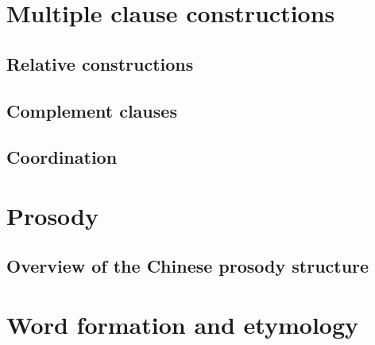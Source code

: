 \documentclass[UTF8, a4paper, oneside, scheme=plain]{ctexbook}
\numberwithin{equation}{chapter}
\numberwithin{equation}{chapter}
\begin{document}
\part{Multiple clause constructions}

\chapter{Relative constructions}\label{chap:relative}

\chapter{Complement clauses}\label{chap:comp-clause}

\chapter{Coordination}

\part{Prosody}

\chapter{Overview of the Chinese prosody structure}\label{chap:prosody-overview}

\part{Word formation and etymology}





\printindex
\end{document}

